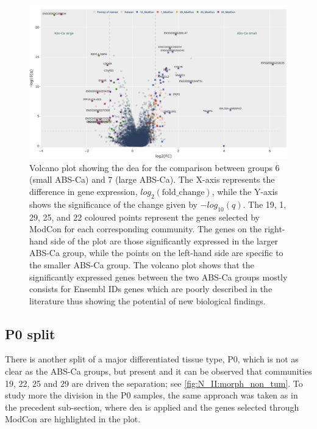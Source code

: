 \begin{figure}   
    \centering
    \includegraphics[width=1.0\textwidth,height=1.0\textheight,keepaspectratio]{Sections/Network_II/resources/non_tum/diff_split_dea.png}
    \caption[Volcano plot between the ABS-Ca splits]{Volcano plot showing the \acrlong{dea} for the comparison between groups 6 (small ABS-Ca) and 7 (large ABS-Ca). The X-axis represents the difference in gene expression, $log_2(\text{fold\_change})$, while the Y-axis shows the significance of the change given by $-log_{10}(q)$. The 19, 1, 29, 25, and 22 coloured points represent the genes selected by ModCon for each corresponding community. The genes on the right-hand side of the plot are those significantly expressed in the larger ABS-Ca group, while the points on the left-hand side are specific to the smaller ABS-Ca group. The volcano plot shows that the significantly expressed genes between the two ABS-Ca groups mostly consists for Ensembl IDs genes which are poorly described in the literature thus showing the potential of new biological findings.}
    \label{fig:N_II:diff_split}
\end{figure}


\subsection{P0 split} \label{s:N_II:p0_split}

There is another split of a major differentiated tissue type, P0,  which is not as clear as the ABS-Ca groups, but present and it can be observed that communities 19, 22, 25 and 29 are driven the separation; see \cref{fig:N_II:morph_non_tum}. To study more the division in the P0 samples, the same approach was taken as in the precedent sub-section, where \acrshort{dea} is applied and the genes selected through ModCon are highlighted in the plot.

